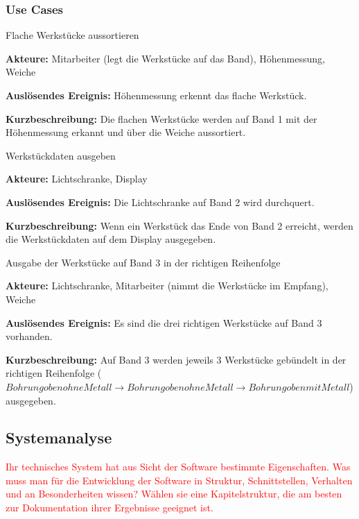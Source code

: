\documentclass[a4paper, 11pt]{article}
\begin{document}
\newpage

\subsubsection{Use Cases}

\begin{compactenum}[1.]
\item Flache Werkstücke aussortieren
\medskip

\textbf{Akteure:} Mitarbeiter (legt die Werkstücke auf das Band), Höhenmessung, Weiche
\medskip

\textbf{Auslösendes Ereignis:} Höhenmessung erkennt das flache Werkstück.
\medskip

\textbf{Kurzbeschreibung:} Die flachen Werkstücke werden auf Band 1 mit der Höhenmessung erkannt und über die Weiche aussortiert.
\bigskip

\item Werkstückdaten ausgeben
\medskip

\textbf{Akteure:} Lichtschranke, Display
\medskip

\textbf{Auslösendes Ereignis:} Die Lichtschranke auf Band 2 wird durchquert.
\medskip

\textbf{Kurzbeschreibung:} Wenn ein Werkstück das Ende von Band 2 erreicht, werden die Werkstückdaten auf dem Display ausgegeben.
\bigskip

\item Ausgabe der Werkstücke auf Band 3 in der richtigen Reihenfolge
\medskip

\textbf{Akteure:} Lichtschranke, Mitarbeiter (nimmt die Werkstücke im Empfang), Weiche
\medskip

\textbf{Auslösendes Ereignis:} Es sind die drei richtigen Werkstücke auf Band 3 vorhanden.
\medskip

\textbf{Kurzbeschreibung:} Auf Band 3 werden jeweils 3 Werkstücke gebündelt in der richtigen Reihenfolge ($Bohrung oben ohne Metall\rightarrow Bohrung oben ohne Metall\rightarrow Bohrung oben mit Metall$) ausgegeben.
\end{compactenum}

\subsection{Systemanalyse}
\textcolor{red}{Ihr technisches System hat aus Sicht der Software bestimmte Eigenschaften. Was muss man für die Entwicklung der Software in Struktur, Schnittstellen, Verhalten und an Besonderheiten wissen? Wählen sie eine Kapitelstruktur, die am besten zur Dokumentation ihrer Ergebnisse geeignet ist.}
\end{document}
